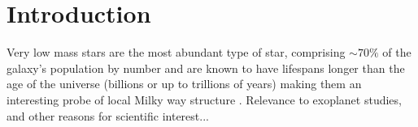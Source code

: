 \documentclass[modern]{aastex62}
\newcommand{\apogee}{\textsl{APOGEE}}
\newcommand{\gaia}{\textsl{Gaia}}
\newcommand{\teff}{$T_{\rm eff}$}
\begin{document}
\begin{abstract}




\end{abstract}

 
\section{Introduction} \label{sec:intro}

Very low mass stars are the most abundant type of star, comprising $\sim 70 \%$ of the galaxy's population by number \citep{Bochanski:2010} and are known to have lifespans longer than the age of the universe (billions or up to trillions of years) \citep{Laughlin:1997} making them an interesting probe of local Milky way structure \citep{Bochanski:2007}. Relevance to exoplanet studies, and other reasons for scientific interest...
\end{document}
